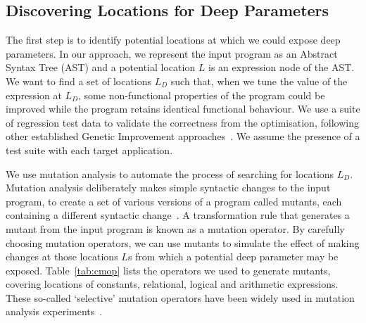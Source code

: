 \subsection{Discovering Locations for Deep Parameters}
\label{discovering}
The first step is to identify potential locations at which we could expose deep parameters. 
In our approach, we represent the input program as an Abstract Syntax Tree (AST) and a potential location $L$ is an expression node of the AST. 
We want to find a set of locations $L_D$ such that, when we tune the value of the expression at $L_D$, some non-functional properties of the program could be improved while the program retains identical functional behaviour.
We use a suite of regression test data to validate the correctness from the optimisation, following other established Genetic Improvement approaches~\cite{babelPidgin,Langdon:2014:IMI:2576768.2598244,justyna2013}. We assume the presence of a test suite with each target application.

We use mutation analysis to automate the process of searching for locations
$L_D$. Mutation analysis deliberately makes simple syntactic changes to the
input program, to create a set of various versions of a program called mutants,
each containing a different syntactic change~\cite{5487526}. A
transformation rule that generates a mutant from the input program is known
as a mutation operator. By carefully choosing mutation operators, we can
use mutants to simulate the effect of making changes at those locations $L$s
from which a potential deep parameter may be exposed. 
Table~\ref{tab:cmop} lists the operators we used to generate
mutants, covering locations of constants, relational, logical and
arithmetic expressions. 
These so-called `selective' mutation operators
have been widely used in mutation analysis experiments~\cite{5487526}.

